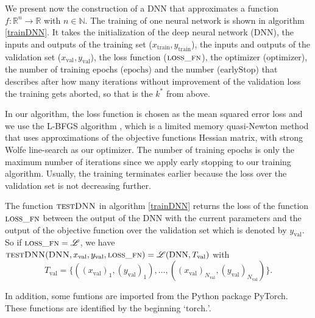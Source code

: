 We present now the construction of a DNN that approximates a function $f:\mathbb{R}^n\to\mathbb{R}$ with $n\in\mathbb{N}$. The training of one neural network is shown in algorithm \ref{trainDNN}. It takes the initialization of the deep neural network ($\mathrm{DNN}$), the inputs and outputs of the training set ($x_\mathrm{train}, y_\mathrm{train}$), the inputs and outputs of the validation set ($x_\mathrm{val}, y_\mathrm{val}$), the loss function ($\textproc{loss\_fn}$), the optimizer ($\mathrm{optimizer}$), the number of training epochs ($\mathrm{epochs}$) and the number ($\mathrm{earlyStop}$) that describes after how many iterations without improvement of the validation loss the training gets aborted, so that is the $k^*$ from above.

In our algorithm, the loss function is chosen as the mean squared error loss and we use the L-BFGS algorithm \cite{Liu1989-ua}, which is a limited memory quasi-Newton method that uses approximations of the objective functions Hessian matrix, with strong Wolfe line-search \cite{doi:10.1137/1011036, doi:10.1137/1013035} as our optimizer. The number of training epochs is only the maximum number of iterations since we apply early stopping to our training algorithm. Usually, the training terminates earlier because the loss over the validation set is not decreasing further.

The function $\textproc{testDNN}$ in algorithm \ref{trainDNN} returns the loss of the function $\textproc{loss\_fn}$ between the output of the DNN with the current parameters and the output of the objective function over the validation set which is denoted by $y_\mathrm{val}$. So if $\textproc{loss\_fn}=\mathscr{L}$, we have $\textproc{testDNN}(\textproc{DNN}, x_\mathrm{val}, y_\mathrm{val}, \textproc{loss\_fn}) = \mathscr{L}(\mathrm{DNN}, T_\mathrm{val})$ with
\begin{displaymath}
T_\mathrm{val}=\{((x_\mathrm{val})_1,(y_\mathrm{val})_1),\dotsc,((x_\mathrm{val})_{N_\mathrm{val}},(y_\mathrm{val})_{N_\mathrm{val}})\}.
\end{displaymath}

In addition, some funtions are imported from the Python package PyTorch. These functions are identified by the beginning `$\mathrm{torch.}$'.

